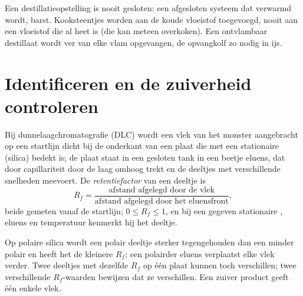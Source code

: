\begin{safety}{}
Een destillatieopstelling is nooit gesloten: een afgesloten systeem dat
verwarmd wordt, barst. Kooksteentjes worden aan de koude vloeistof
toegevoegd, nooit aan een vloeistof die al heet is (die kan meteen
overkoken). Een ontvlambaar destillaat wordt ver van elke vlam
opgevangen, de opvangkolf zo nodig in ijs.
\end{safety}

\section{Identificeren en de zuiverheid controleren}

\begin{definition}[Retentiefactor]\label{def:b1:lab-techniques-1:retention-factor}
Bij dunnelaagchromatografie (DLC) wordt een vlek van het monster
aangebracht op een startlijn dicht bij de onderkant van een plaat die met
een stationaire  (silica) bedekt is; de plaat staat in een gesloten
tank in een beetje eluens, dat door capillariteit door de laag omhoog
trekt en de deeltjes met verschillende snelheden meevoert. De
\emph{retentiefactor} van een deeltje is
\[
  R_f = \frac{\text{afstand afgelegd door de vlek}}
             {\text{afstand afgelegd door het eluensfront}},
\]
beide gemeten vanaf de startlijn; $0 \le R_f \le 1$, en bij een gegeven
stationaire , eluens en temperatuur kenmerkt hij het deeltje.
\end{definition}

Op polaire silica wordt een polair deeltje sterker tegengehouden dan een
minder polair en heeft het de kleinere $R_f$; een polairder eluens
verplaatst elke vlek verder. Twee deeltjes met dezelfde $R_f$ op één
plaat kunnen toch verschillen; twee verschillende $R_f$-waarden bewijzen
dat ze verschillen. Een zuiver product geeft één enkele vlek.

